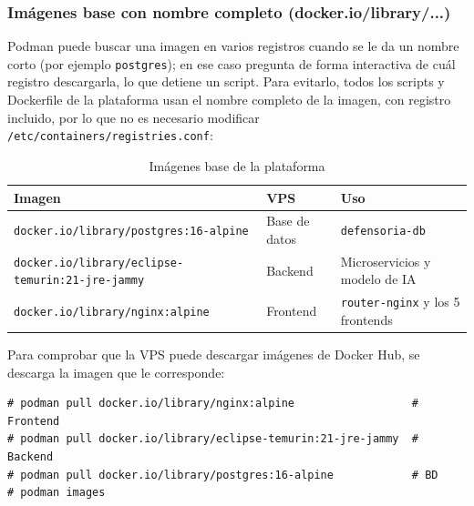 \subsubsection{Imágenes base con nombre completo (docker.io/library/...)}
Podman puede buscar una imagen en varios registros cuando se le da un nombre corto (por ejemplo \texttt{postgres}); en ese caso pregunta de forma interactiva de cuál registro descargarla, lo que detiene un script. Para evitarlo, todos los scripts y Dockerfile de la plataforma usan el nombre completo de la imagen, con registro incluido, por lo que no es necesario modificar \texttt{/etc/containers/registries.conf}:

\begin{table}[H]
\centering
\caption{Imágenes base de la plataforma}
\footnotesize
\begin{tabular}{p{8.7cm}p{2.0cm}p{3.6cm}}
\toprule
\textbf{Imagen} & \textbf{VPS} & \textbf{Uso} \\
\midrule
\texttt{docker.io/library/postgres:16-alpine} & Base de datos & \texttt{defensoria-db} \\
\texttt{docker.io/library/eclipse-temurin:21-jre-jammy} & Backend & Microservicios y modelo de IA \\
\texttt{docker.io/library/nginx:alpine} & Frontend & \texttt{router-nginx} y los 5 frontends \\
\bottomrule
\end{tabular}
\end{table}

Para comprobar que la VPS puede descargar imágenes de Docker Hub, se descarga la imagen que le corresponde:
\begin{lstlisting}
# podman pull docker.io/library/nginx:alpine                  # Frontend
# podman pull docker.io/library/eclipse-temurin:21-jre-jammy  # Backend
# podman pull docker.io/library/postgres:16-alpine            # BD
# podman images
\end{lstlisting}

